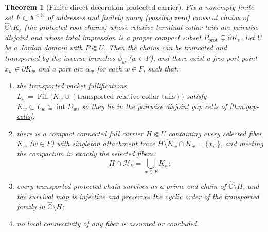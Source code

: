 \documentclass[11pt,reqno]{amsart}
\numberwithin{equation}{section}
\theoremstyle{plain}
\newtheorem{theorem}{Theorem}[section]
\theoremstyle{definition}
\theoremstyle{remark}
\DeclareMathOperator{\Fill}{Fill}
\newcommand{\Chat}{\widehat{\mathbb C}}
\newcommand{\N}{\mathbb N}
\newcommand{\A}{\mathtt A}
\newcommand{\Words}{\A^{<\N}}
\newcommand{\HB}{\mathcal H_\partial}
\newcommand{\rootK}{K_{\epsilon}}
\begin{document}
\begin{theorem}[Finite direct-decoration protected carrier]
\label{thm:protected-carrier}
Fix a nonempty finite set $F\subset\Words$ of addresses and finitely
many (possibly zero) crosscut chains of $\Chat\setminus\rootK$ (the
\emph{protected root chains}) whose relative terminal collar tails are
pairwise disjoint and whose total impression is a proper compact subset
$P_{\mathrm{prot}}\subsetneq\partial\rootK$.  Let $U$ be a Jordan
domain with $P\Subset U$.  Then the chains can be truncated and
transported by the inverse branches $\phi_w$ ($w\in F$), and there
exist a free port point $x_w\in\partial K_w$ and a port arc $\alpha_w$
for each $w\in F$, such that:
\begin{enumerate}[label=\textup{(\roman*)}]
 \item \label{car:packets} the transported packet fullifications
  $L_w=\Fill\bigl(K_w\cup(\text{transported relative collar
  tails})\bigr)$ satisfy $K_w\subset L_w\Subset\operatorname{int}D_w$,
  so they lie in the pairwise disjoint gap cells of
  \cref{thm:gap-cells};
 \item \label{car:carrier} there is a compact connected full carrier
  $H\Subset U$ containing every selected fiber $K_w$ ($w\in F$) with
  singleton attachment trace
  $\overline{H\setminus K_w}\cap K_w=\{x_w\}$, and meeting the
  compactum in exactly the selected fibers:
  \begin{equation}
   H\cap\HB=\bigcup_{w\in F}K_w ;
  \label{eq:exact-trace}
  \end{equation}
 \item \label{car:survival} every transported protected chain survives
  as a prime-end chain of $\Chat\setminus H$, and the survival map is
  injective and preserves the cyclic order of the transported family
  in $\Chat\setminus H$;
 \item \label{car:no-lc} no local connectivity of any fiber is assumed
  or concluded.
\end{enumerate}
\end{theorem}
\end{document}
